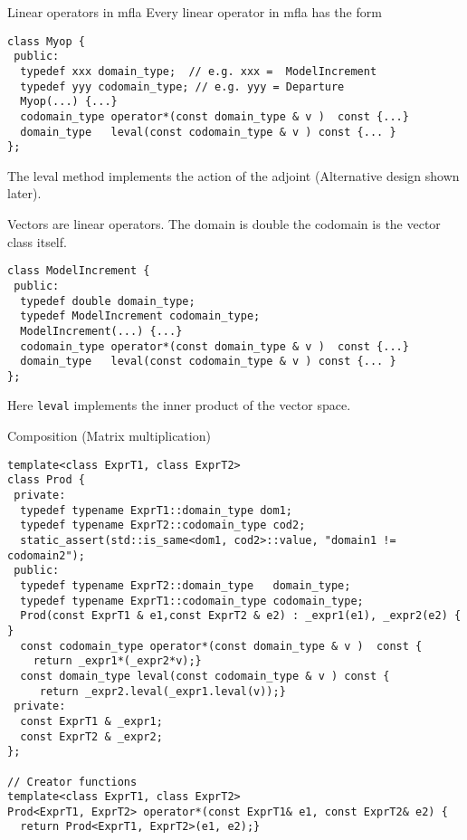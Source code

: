 \documentclass[9pt]{beamer}
\begin{document}
\begin{frame}[fragile]{Linear operators in mfla}
Every linear operator in mfla has the form
\begin{lstlisting}
class Myop {
 public:
  typedef xxx domain_type;  // e.g. xxx =  ModelIncrement
  typedef yyy codomain_type; // e.g. yyy = Departure
  Myop(...) {...}
  codomain_type operator*(const domain_type & v )  const {...}
  domain_type   leval(const codomain_type & v ) const {... }
};
\end{lstlisting}
The leval method implements the action of the adjoint (Alternative design shown later).

\pause

Vectors are linear operators. The domain is double the codomain is the vector class itself.

\begin{lstlisting}
class ModelIncrement {
 public:
  typedef double domain_type;
  typedef ModelIncrement codomain_type;
  ModelIncrement(...) {...}
  codomain_type operator*(const domain_type & v )  const {...}
  domain_type   leval(const codomain_type & v ) const {... }
};
\end{lstlisting}

Here \lstinline|leval| implements the inner product of the vector space.

\end{frame}
\begin{frame}[fragile]{Composition (Matrix multiplication) }
\begin{lstlisting}
template<class ExprT1, class ExprT2>
class Prod {
 private:
  typedef typename ExprT1::domain_type dom1;
  typedef typename ExprT2::codomain_type cod2;
  static_assert(std::is_same<dom1, cod2>::value, "domain1 != codomain2");
 public:
  typedef typename ExprT2::domain_type   domain_type;
  typedef typename ExprT1::codomain_type codomain_type;
  Prod(const ExprT1 & e1,const ExprT2 & e2) : _expr1(e1), _expr2(e2) { }
  const codomain_type operator*(const domain_type & v )  const {
    return _expr1*(_expr2*v);}
  const domain_type leval(const codomain_type & v ) const {
     return _expr2.leval(_expr1.leval(v));}
 private:
  const ExprT1 & _expr1;
  const ExprT2 & _expr2;
};

// Creator functions
template<class ExprT1, class ExprT2>
Prod<ExprT1, ExprT2> operator*(const ExprT1& e1, const ExprT2& e2) {
  return Prod<ExprT1, ExprT2>(e1, e2);}
\end{lstlisting}

\end{frame}
\end{document}
